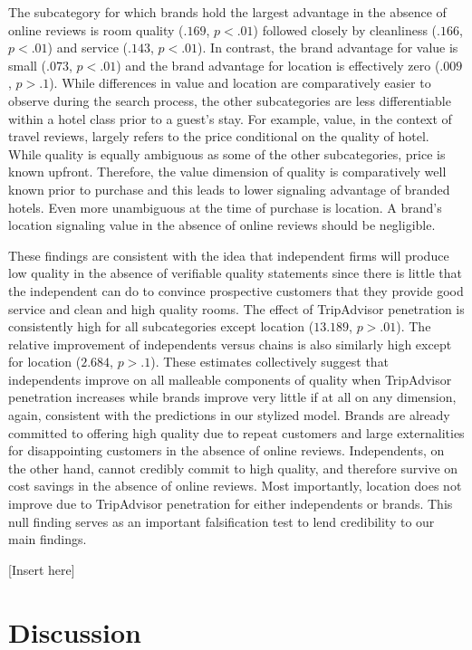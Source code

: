 \documentclass{informs_mod} %
\begin{document}
The subcategory for which brands hold the largest advantage in the absence of online reviews is room quality ($.169$, $p<.01$) followed closely by cleanliness ($.166$, $p<.01$) and service ($.143$, $p<.01$). In contrast, the brand advantage for value is small ($.073$, $p<.01$) and the brand advantage for location is effectively zero ($.009$, $p>.1$). While differences in value and location are comparatively easier to observe during the search process, the other subcategories are less differentiable within a hotel class prior to a guest's stay. For example, value, in the context of travel reviews, largely refers to the price conditional on the quality of hotel. While quality is equally ambiguous as some of the other subcategories, price is known upfront. Therefore, the value dimension of quality is comparatively well known prior to purchase and this leads to lower signaling advantage of branded hotels. Even more unambiguous at the time of purchase is location. A brand's location signaling value in the absence of online reviews should be negligible.

These findings are consistent with the idea that independent firms will produce low quality in the absence of verifiable quality statements since there is little that the independent can do to convince prospective customers that they provide good service and clean and high quality rooms. The effect of TripAdvisor penetration is consistently high for all subcategories except location ($13.189$, $p>.01$). The relative improvement of independents versus chains is also similarly high except for location ($2.684$, $p>.1$). These estimates collectively suggest that independents improve on all malleable components of quality when TripAdvisor penetration increases while brands improve very little if at all on any dimension, again, consistent with the predictions in our stylized model. Brands are already committed to offering high quality due to repeat customers and large externalities for disappointing customers in the absence of online reviews. Independents, on the other hand, cannot credibly commit to high quality, and therefore survive on cost savings in the absence of online reviews. Most importantly, location does not improve due to TripAdvisor penetration for either independents or brands. This null finding serves as an important falsification test to lend credibility to our main findings.

[Insert  here]

\section{Discussion} \label{sec:discussion}
\end{document}
